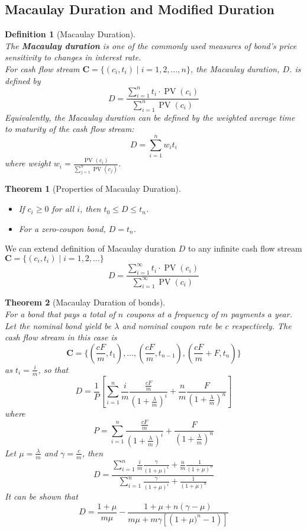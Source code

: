 \documentclass[11pt]{article}
\newtheorem{definition}{Definition}[section]
\newtheorem{theorem}{Theorem}[section]
\theoremstyle{definition}
\DeclareMathOperator{\PV}{PV}
\newcommand\cf[1]{\mathbf{#1}}
\begin{document}
\subsection{Macaulay Duration and Modified Duration}
\begin{definition}[Macaulay Duration]
\hfill\\\normalfont The \textbf{Macaulay duration} is one of the commonly used measures of bond's price sensitivity to changes in interest rate.\\
For cash flow stream $\cf{C}=\{(c_i,t_i)\mid i = 1, 2, \ldots, n\}$, the Macaulay duration, $D$. is defined by
\[
D=\frac{\sum_{i=1}^nt_i\cdot\PV(c_i)}{\sum_{i=1}^n\PV(c_i)}
\]
Equivalently, the Macaulay duration can be defined by the weighted average time to maturity of the cash flow stream:
\[
D=\sum_{i=1}^nw_it_i
\]
where weight $w_i = \frac{\PV(c_i)}{\sum_{j=1}^n\PV(c_j)}$.
\end{definition}
\begin{theorem}[Properties of Macaulay Duration]\hfill\\\normalfont
\begin{itemize}
  \item If $c_i\geq 0$ for all $i$, then $t_0\leq D\leq t_n$.
  \item For a zero-coupon bond, $D=t_n$.
\end{itemize}
\end{theorem}
We can extend definition of Macaulay duration $D$ to any infinite cash flow stream $\cf{C}=\{(c_i,t_i)\mid i = 1, 2,\ldots\}$
\[
D=\frac{\sum_{i=1}^\infty t_i\cdot\PV(c_i)}{\sum_{i=1}^\infty\PV(c_i)}
\] 
\begin{theorem}[Macaulay Duration of bonds]\hfill\\\normalfont
For a bond that pays a total of $n$ coupons at a frequency of $m$ payments a year. Let the nominal bond yield be $\lambda$ and nominal coupon rate be $c$ respectively. The cash flow stream in this case is
\[
\cf{C}=\{(\frac{cF}{m}, t_1),\ldots, (\frac{cF}{m},t_{n-1}),(\frac{cF}{m}+F,t_n)\}
\]
as $t_i = \frac{i}{m}$, so that
\[
D=\frac{1}{P}\left[\sum_{i=1}^n\frac{i}{m}\frac{\frac{cF}{m}}{\left(1+\frac{\lambda}{m}\right)^i}+\frac{n}{m}\frac{F}{\left(1+\frac{\lambda}{m}\right)^n}\right]
\]
where
\[
P=\sum_{i=1}^n\frac{\frac{cF}{m}}{\left(1+\frac{\lambda}{m}\right)^i}+\frac{F}{\left(1+\frac{\lambda}{m}\right)^n}
\]
Let $\mu = \frac{\lambda}{m}$ and $\gamma = \frac{c}{m}$, then
\[
D = \frac{\sum_{i=1}^n\frac{i}{m}\frac{\gamma}{(1+\mu)^i}+\frac{n}{m}\frac{1}{(1+\mu)^n}}{\sum_{i=1}^n\frac{\gamma}{(1+\mu)^i}+\frac{1}{(1+\mu)^n}}
\]
It can be shown that
\[
D = \frac{1+\mu}{m\mu}-\frac{1+\mu+n(\gamma-\mu)}{m\mu+m\gamma\left[\left(1+\mu)^n-1\right)\right]}
\]
\end{theorem}
\end{document}
